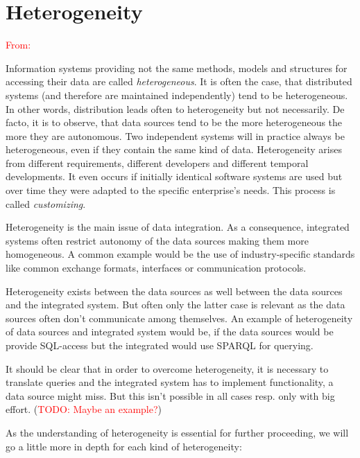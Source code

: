 \section{Heterogeneity}
\textcolor{red}{From: \cite[chapter 3.3 (p.58-78)]{DBLP:books/dp/LeserN2006}}

Information systems providing not the same methods, models and structures for accessing their data are called \textit{heterogeneous}. It is often the case, that distributed systems (and therefore are maintained independently) tend to be heterogeneous. In other words, distribution leads often to heterogeneity but not necessarily. De facto, it is to observe, that data sources tend to be the more heterogeneous the more they are autonomous. Two independent systems will in practice always  be heterogeneous, even if they contain the same kind of data. Heterogeneity arises from different requirements, different developers and different temporal developments. It even occurs if initially identical software systems are used but over time they were adapted to the specific enterprise's needs. This process is called \textit{customizing}. 

Heterogeneity is the main issue of data integration. As a consequence, integrated systems often restrict autonomy of the data sources making them more homogeneous. A common example would be the use of industry-specific standards like common exchange formats, interfaces or communication protocols.

Heterogeneity exists between the data sources as well between the data sources and the integrated system. But often only the latter case is relevant as the data sources often don't communicate among themselves. An example of heterogeneity of data sources and integrated system would be, if the data sources would be provide SQL-access but the integrated would use SPARQL for querying.

It should be clear that in order to overcome heterogeneity, it is necessary to translate queries and the integrated system has to implement functionality, a data source might miss. But this isn't possible in all cases resp. only with big effort. (\textcolor{red}{TODO: Maybe an example?})

As the understanding of heterogeneity is essential for further proceeding, we will go a little more in depth for each kind of heterogeneity:

